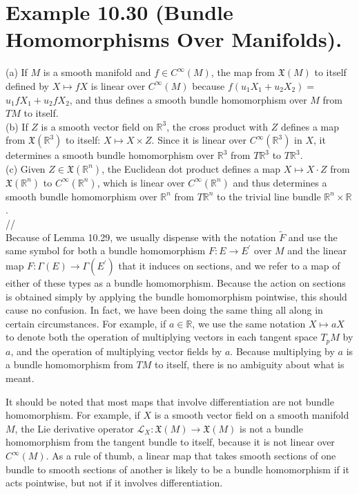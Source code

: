 \documentclass[10pt]{article}
\begin{document}
\section*{Example 10.30 (Bundle Homomorphisms Over Manifolds).}
(a) If $M$ is a smooth manifold and $f \in C^{\infty}(M)$, the map from $\mathfrak{X}(M)$ to itself defined by $X \mapsto f X$ is linear over $C^{\infty}(M)$ because $f\left(u_{1} X_{1}+u_{2} X_{2}\right)=$ $u_{1} f X_{1}+u_{2} f X_{2}$, and thus defines a smooth bundle homomorphism over $M$ from $T M$ to itself.\\
(b) If $Z$ is a smooth vector field on $\mathbb{R}^{3}$, the cross product with $Z$ defines a map from $\mathfrak{X}\left(\mathbb{R}^{3}\right)$ to itself: $X \mapsto X \times Z$. Since it is linear over $C^{\infty}\left(\mathbb{R}^{3}\right)$ in $X$, it determines a smooth bundle homomorphism over $\mathbb{R}^{3}$ from $T \mathbb{R}^{3}$ to $T \mathbb{R}^{3}$.\\
(c) Given $Z \in \mathfrak{X}\left(\mathbb{R}^{n}\right)$, the Euclidean dot product defines a map $X \mapsto X \cdot Z$ from $\mathfrak{X}\left(\mathbb{R}^{n}\right)$ to $C^{\infty}\left(\mathbb{R}^{n}\right)$, which is linear over $C^{\infty}\left(\mathbb{R}^{n}\right)$ and thus determines a smooth bundle homomorphism over $\mathbb{R}^{n}$ from $T \mathbb{R}^{n}$ to the trivial line bundle $\mathbb{R}^{n} \times \mathbb{R}$.\\
//\\
Because of Lemma 10.29, we usually dispense with the notation $\widetilde{F}$ and use the same symbol for both a bundle homomorphism $F: E \rightarrow E^{\prime}$ over $M$ and the linear map $F: \Gamma(E) \rightarrow \Gamma\left(E^{\prime}\right)$ that it induces on sections, and we refer to a map of either of these types as a bundle homomorphism. Because the action on sections is obtained simply by applying the bundle homomorphism pointwise, this should cause no confusion. In fact, we have been doing the same thing all along in certain circumstances. For example, if $a \in \mathbb{R}$, we use the same notation $X \mapsto a X$ to denote both the operation of multiplying vectors in each tangent space $T_{p} M$ by $a$, and the operation of multiplying vector fields by $a$. Because multiplying by $a$ is a bundle homomorphism from $T M$ to itself, there is no ambiguity about what is meant.

It should be noted that most maps that involve differentiation are not bundle homomorphism. For example, if $X$ is a smooth vector field on a smooth manifold $M$, the Lie derivative operator $\mathscr{L}_{X}: \mathfrak{X}(M) \rightarrow \mathfrak{X}(M)$ is not a bundle homomorphism from the tangent bundle to itself, because it is not linear over $C^{\infty}(M)$. As a rule of thumb, a linear map that takes smooth sections of one bundle to smooth sections of another is likely to be a bundle homomorphism if it acts pointwise, but not if it involves differentiation.
\end{document}
